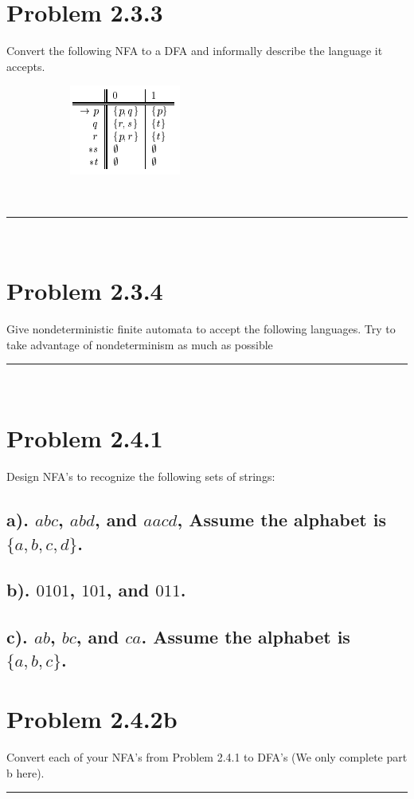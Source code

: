 \documentclass[20pt]{article} %
\begin{document}
\section{Problem 2.3.3}
Convert the following NFA to a DFA and informally describe the language it accepts. 
\begin{figure}[!htbp]
  	\centering
   	\begin{subfigure}[p]{0.3\linewidth}
    	\includegraphics[width=\linewidth]{./figures/HW2fig2.png}
   	\end{subfigure}
\end{figure} \\
\noindent\rule{2cm}{0.4pt} \\


\section{Problem 2.3.4} 
Give nondeterministic finite automata to accept the following languages. Try to take advantage of nondeterminism as much as possible \\
\noindent\rule{2cm}{0.4pt} \\


\section{Problem 2.4.1}
Design NFA's to recognize the following sets of strings:

\subsection{a). $abc$, $abd$, and $aacd$, Assume the alphabet is $\{a,b,c,d\}$.}

\subsection{b). $0101$, $101$, and $011$.}

\subsection{c). $ab$, $bc$, and $ca$. Assume the alphabet is $\{a,b,c\}$. }

\section{Problem 2.4.2b}
Convert each of your NFA's from Problem 2.4.1 to DFA's (We only complete part b here).
\noindent\rule{2cm}{0.4pt} \\
\end{document}
